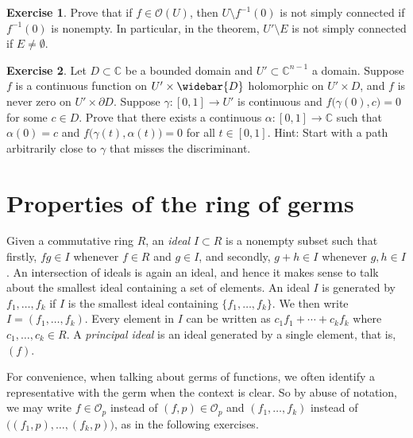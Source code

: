 \documentclass[12pt,openany]{book}
\newcommand{\C}{{\mathbb{C}}}
\newcommand{\sO}{{\mathscr{O}}}
\newcommand{\myindex}[1]{#1\index{#1}}
\theoremstyle{plain}
\theoremstyle{remark}
\theoremstyle{definition}
\newenvironment{exbox}{%
    \def\FrameCommand{\vrule width 1pt \relax\hspace{10pt}}%
    \MakeFramed{\advance\hsize-\width\FrameRestore}%
}{%
    \endMakeFramed
}
\theoremstyle{exercise}
\newtheorem{exercise}{Exercise}[section]
\theoremstyle{example}
\begin{document}
\begin{exbox}
\begin{exercise}
Prove that if $f \in \sO(U)$, then $U \setminus f^{-1}(0)$ is not simply
connected if $f^{-1}(0)$ is nonempty.  In particular, in the theorem, $U' \setminus E$ is not
simply connected if $E \neq \emptyset$.
\end{exercise}

\begin{exercise}
\pagebreak[2]
Let $D \subset \C$ be a bounded domain
and
$U' \subset \C^{n-1}$ a domain.
Suppose
$f$ is a continuous function on
$U' \times \widebar{D}$ holomorphic on $U' \times D$,
and $f$ is never zero on
$U' \times \partial D$.
Suppose $\gamma \colon [0,1] \to U'$ is continuous and
$f\bigl(\gamma(0),c\bigr) = 0$ for some $c \in D$.
Prove that there exists a continuous $\alpha \colon [0,1] \to \C$
such that $\alpha(0) = c$ and
$f\bigl(\gamma(t),\alpha(t)\bigr) = 0$ for all $t \in [0,1]$.
Hint: Start with a path arbitrarily close to $\gamma$
that misses the discriminant.
\end{exercise}
\end{exbox}


\section{Properties of the ring of germs} \label{sec:propertiesofringofgerms}

Given a commutative ring $R$,
an \emph{\myindex{ideal}} $I \subset R$ is
a nonempty subset such that firstly, $f g \in I$ whenever $f \in R$ and $g \in I$,
and secondly, $g+h \in I$ whenever $g,h \in I$.
An intersection of ideals is again an ideal, and hence it makes sense to
talk about the smallest ideal containing a set of elements.
An ideal $I$ is generated by $f_1,\ldots,f_k$
if $I$ is the smallest ideal containing $\{ f_1,\ldots,f_k \}$.  We then
%
write $I = (f_1,\ldots,f_k)$.
Every element in $I$ can be written as $c_1 f_1 + \cdots + c_k f_k$
where $c_1,\ldots,c_k \in R$.
A \emph{\myindex{principal ideal}}
is an ideal generated by a single element, that is, $(f)$.

For convenience, when talking about germs of functions,
we often identify a representative
with the germ when the context is clear.
So by abuse of notation, we may write
$f \in \sO_p$ instead of $(f,p) \in \sO_p$ and
$(f_1,\ldots,f_k)$ instead of $\bigl((f_1,p),\ldots,(f_k,p)\bigr)$,
as in the following exercises.
\end{document}
